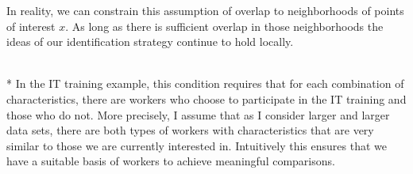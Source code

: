 In reality, we can constrain this assumption of overlap to neighborhoods of points of interest $x$.
As long as there is sufficient overlap in those neighborhoods the ideas of our identification strategy continue to hold locally.
\begin{boxE}
    \addtocounter{exmp}{-1}
    \begin{exmp}\mbox{}\\*
        In the IT training example, this condition requires that for each combination of characteristics, there are workers who choose to participate in the IT training and those who do not.
        More precisely, I assume that as I consider larger and larger data sets, there are both types of workers with characteristics that are very similar to those we are currently interested in.
        Intuitively this ensures that we have a suitable basis of workers to achieve meaningful comparisons.
    \end{exmp}    
\end{boxE}

